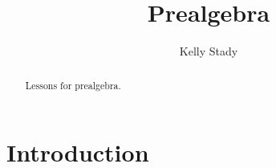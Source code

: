 \documentclass{xourse}
\title{Prealgebra}
\author{Kelly Stady}
\begin{document}
\begin{abstract}
    Lessons for prealgebra.
\end{abstract}
\maketitle

\part{Introduction}  %

\end{document}
